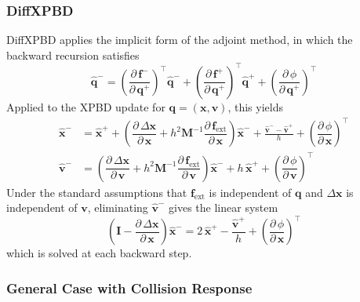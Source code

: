 \documentclass{article}
\newcommand{\pd}[2]{\dfrac{\partial\, #1}{\partial\, #2}}
\begin{document}
\subsubsection{DiffXPBD \cite{stuyck2023diffxpbd}}
DiffXPBD applies the implicit form of the adjoint method, in which the backward recursion satisfies
\begin{equation}
    \hat{\mathbf{q}}^- = \left(\pd{\mathbf{f}^-}{\mathbf{q}^+}\right)^{\!\top}\!\hat{\mathbf{q}}^- + \left(\pd{\mathbf{f}^+}{\mathbf{q}^+} \right)^{\!\top}\!\hat{\mathbf{q}}^+ + \left( \pd{\phi}{\mathbf{q}^+} \right)^{\!\top}
\end{equation}
Applied to the XPBD update for $\mathbf{q} = (\mathbf{x}, \mathbf{v})$, this yields
\begin{align}
    \hat{\mathbf{x}}^- &= \hat{\mathbf{x}}^+ + \left( \pd{\Delta \mathbf{x}}{\mathbf{x}} + h^2\mathbf{M}^{-1}\pd{\mathbf{f}_{\text{ext}}}{\mathbf{x}} \right)\hat{\mathbf{x}}^- + \frac{\hat{\mathbf{v}}^- - \hat{\mathbf{v}}^+}{h} + \left(\pd{\phi}{\mathbf{x}}\right)^{\!\top} \\
    \hat{\mathbf{v}}^- &= \left( \pd{\Delta \mathbf{x}}{\mathbf{v}} + h^2\mathbf{M}^{-1}\pd{\mathbf{f}_{\text{ext}}}{\mathbf{v}} \right)\hat{\mathbf{x}}^- + h\,\hat{\mathbf{x}}^+ + \left(\pd{\phi}{\mathbf{v}}\right)^{\!\top}
\end{align}
Under the standard assumptions that $\mathbf{f}_{\text{ext}}$ is independent of $\mathbf{q}$ and $\Delta \mathbf{x}$ is independent of $\mathbf{v}$, eliminating $\hat{\mathbf{v}}^-$ gives the linear system
\begin{equation}
    \left(\mathbf{I} - \pd{\Delta \mathbf{x}}{\mathbf{x}}\right)\hat{\mathbf{x}}^- = 2\,\hat{\mathbf{x}}^+ - \frac{\hat{\mathbf{v}}^+}{h} + \left(\pd{\phi}{\mathbf{x}}\right)^{\!\top}
\end{equation}
which is solved at each backward step.

\subsubsection{General Case with Collision Response}
\end{document}
